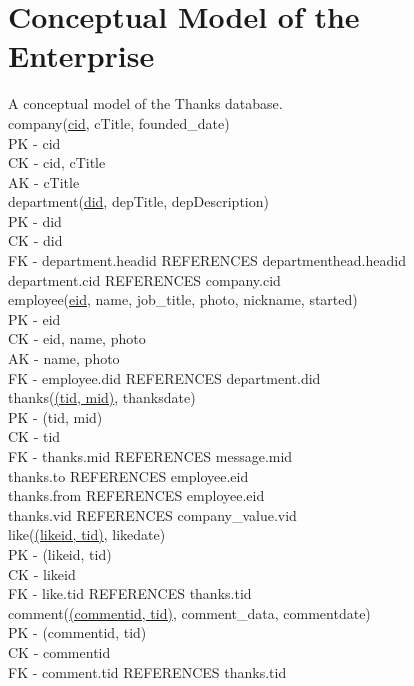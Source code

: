 \documentclass[11pt]{report}
\begin{document}
\section{Conceptual Model of the Enterprise}
A conceptual model of the Thanks database. \\

company(\underline{cid}, cTitle, founded\_date) \\
PK - cid \\
CK - cid, cTitle \\
AK - cTitle \\

department(\underline{did}, depTitle, depDescription) \\
PK - did \\
CK - did \\
FK - department.headid REFERENCES departmenthead.headid \\
     department.cid REFERENCES company.cid \\

employee(\underline{eid}, name, job\_title, photo, nickname, started) \\
PK - eid \\
CK - eid, name, photo \\
AK - name, photo \\
FK - employee.did REFERENCES department.did \\

thanks(\underline{(tid, mid)}, thanksdate) \\
PK - (tid, mid) \\
CK - tid \\
FK - thanks.mid REFERENCES message.mid \\
     thanks.to REFERENCES employee.eid \\
     thanks.from REFERENCES employee.eid \\
     thanks.vid REFERENCES company\_value.vid \\

like(\underline{(likeid, tid)}, likedate) \\
PK - (likeid, tid) \\
CK - likeid \\
FK - like.tid REFERENCES thanks.tid \\

comment(\underline{(commentid, tid)}, comment\_data, commentdate) \\
PK - (commentid, tid) \\
CK - commentid \\
FK - comment.tid REFERENCES thanks.tid \\
\end{document}
